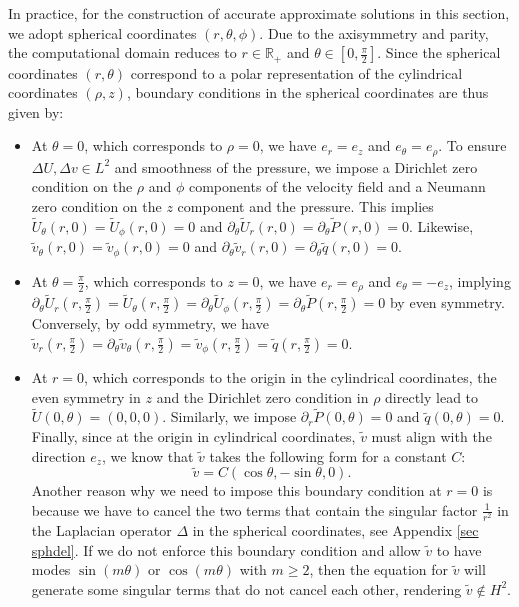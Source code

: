 \documentclass[11pt,a4paper]{article}
\numberwithin{equation}{section}
\newenvironment{itemizedot}{\begin{itemize} \renewcommand{\labelitemi}{$\bullet$}\renewcommand{\labelitemii}{$\bullet$}\renewcommand{\labelitemiii}{$\bullet$}\renewcommand{\labelitemiv}{$\bullet$}}{\end{itemize}}
\begin{document}
In practice, for the construction of accurate approximate solutions in this section, we adopt spherical coordinates $(r, \theta, \phi)$.  Due to the axisymmetry and parity, the computational
domain reduces to $r \in \mathbb{R}_+$ and $\theta \in \left[ 0, \frac{\pi}{2}
\right]$. Since the spherical coordinates $(r,\theta)$ correspond to a polar representation  of the cylindrical coordinates $(\rho,z)$, boundary conditions in the spherical coordinates are thus given by:
\begin{itemizedot}
  \item At $\theta = 0$, which corresponds to $\rho=0$, we have $e_r =e_z $ and $e_{\theta}=e_\rho$. To ensure $\Delta U,\Delta v\in L^2$ and smoothness of the pressure, we impose a Dirichlet zero condition on the $\rho$ and $\phi$ components of the velocity field and a Neumann zero condition on the $z$ component and the pressure.  This implies $\widetilde{U}_{\theta} (r, 0) = \widetilde{U}_{\phi} (r, 0)
  = 0$ and  $\partial_\theta
  \widetilde{U}_r (r, 0) =\partial_\theta\widetilde{P}(r, 0)= 0$. Likewise, $\widetilde{v}_{\theta} (r, 0) = \widetilde{v}_{\phi} (r, 0)
  = 0$ and  $\partial_\theta
  \widetilde{v}_r (r, 0) =\partial_\theta\widetilde{q}(r, 0)= 0$.
  
  \item At $\theta = \frac{\pi}{2}$, which corresponds to $z=0$, we have $e_r =e_\rho $ and $e_{\theta}=-e_z$, implying  $\partial_\theta \widetilde{U}_r \left( r, \frac{\pi}{2} \right) =
  \widetilde{U}_{\theta} \left( r, \frac{\pi}{2} \right) = \partial_\theta
  \widetilde{U}_{\phi} \left( r, \frac{\pi}{2} \right) = \partial_\theta
  \widetilde{P} \left( r, \frac{\pi}{2} \right)= 0$ by even symmetry. Conversely, by odd symmetry, we have $ \widetilde{v}_r \left( r, \frac{\pi}{2} \right) =
 \partial_\theta \widetilde{v}_{\theta} \left( r, \frac{\pi}{2} \right) = 
  \widetilde{v}_{\phi} \left( r, \frac{\pi}{2} \right) = 
  \widetilde{q} \left( r, \frac{\pi}{2} \right)= 0$.
  
  \item At $r = 0$,  which corresponds to the origin in the cylindrical coordinates, the even symmetry in $z$ and the Dirichlet zero condition in $\rho$ directly
  lead to $\widetilde{U} (0, \theta) = (0, 0, 0) .$ Similarly, we impose $\partial_r \widetilde{P}(0, \theta)=0$ and  $\widetilde{q}(0, \theta)=0$. Finally, since at  the origin in cylindrical coordinates, $\widetilde{v}$ must align with the direction
  $e_z$, we know that $\widetilde{v}$ takes the following form for a constant $C$:\begin{equation}
  \label{v-boundary-condition}
 \widetilde{v} =  C
  (\cos \theta, -\sin \theta, 0).
  \end{equation} 
  Another reason why we need to impose this boundary condition at $r=0$ is because we have to cancel the two  terms that contain the singular factor $\frac{1}{r^2}$ in the Laplacian operator $\Delta$ in the spherical coordinates, see Appendix \ref{sec sphdel}.
If we do not enforce this boundary condition and allow $\widetilde{v}$ to have modes $\sin(m\theta)$ or $\cos(m\theta)$ with $m \geqslant 2$, then the equation for $\widetilde{v}$ will generate some singular terms that do not cancel each other, rendering $\widetilde{v}\notin H^2$.
  

\end{itemizedot}
\end{document}

